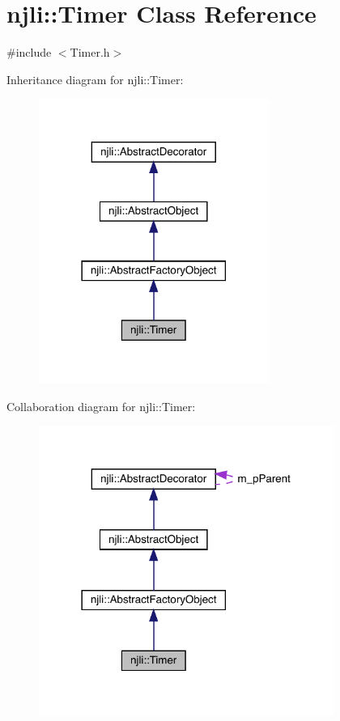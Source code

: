 \hypertarget{classnjli_1_1_timer}{}\section{njli\+:\+:Timer Class Reference}
\label{classnjli_1_1_timer}


{\ttfamily \#include $<$Timer.\+h$>$}



Inheritance diagram for njli\+:\+:Timer\+:\nopagebreak
\begin{figure}[H]
\begin{center}
\leavevmode
\includegraphics[width=213pt]{classnjli_1_1_timer__inherit__graph}
\end{center}
\end{figure}


Collaboration diagram for njli\+:\+:Timer\+:\nopagebreak
\begin{figure}[H]
\begin{center}
\leavevmode
\includegraphics[width=273pt]{classnjli_1_1_timer__coll__graph}
\end{center}
\end{figure}
